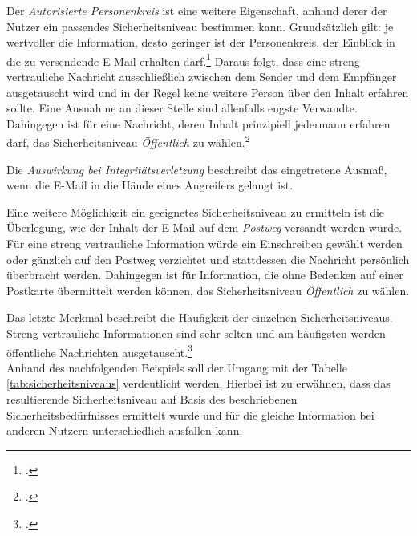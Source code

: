 \documentclass  [paper=a4,
				fontsize=12pt,
				listof=totoc,
				bibliography=totoc
				]{scrreprt}
\begin{document}
		
		Der \textit{Autorisierte Personenkreis} ist eine weitere Eigenschaft, anhand derer der Nutzer ein passendes Sicherheitsniveau bestimmen kann. Grundsätzlich gilt: je wertvoller die Information, desto geringer ist der Personenkreis, der Einblick in die zu versendende E-Mail erhalten darf.\footcite[Vgl.][]{TSE} Daraus folgt, dass eine streng vertrauliche Nachricht ausschließlich zwischen dem Sender und dem Empfänger ausgetauscht wird und in der Regel keine weitere Person über den Inhalt erfahren sollte. Eine Ausnahme an dieser Stelle sind allenfalls engste Verwandte. Dahingegen ist für eine Nachricht, deren Inhalt prinzipiell jedermann erfahren darf, das Sicherheitsniveau \textit{Öffentlich} zu wählen.\footcite[Vgl.][S. 10]{Reinhausen12}
		
		
		Die \textit{Auswirkung bei Integritätsverletzung} beschreibt das eingetretene Ausmaß, wenn die E-Mail in die Hände eines Angreifers gelangt ist.
		
		
		Eine weitere Möglichkeit ein geeignetes Sicherheitsniveau zu ermitteln ist die Überlegung, wie der Inhalt der E-Mail auf dem \textit{Postweg} versandt werden würde. Für eine streng vertrauliche Information würde ein Einschreiben gewählt werden oder gänzlich auf den Postweg verzichtet und stattdessen die Nachricht persönlich überbracht werden. Dahingegen ist für Information, die ohne Bedenken  auf einer Postkarte übermittelt werden können, das Sicherheitsniveau \textit{Öffentlich} zu wählen. 
		
		
		Das letzte Merkmal beschreibt die Häufigkeit der einzelnen Sicherheitsniveaus. Streng vertrauliche Informationen sind sehr selten und am häufigsten werden öffentliche Nachrichten ausgetauscht.\footcite[Vgl.][]{TSE}
		\bigskip\\
		Anhand des nachfolgenden Beispiels soll der Umgang mit der Tabelle \ref{tab:sicherheitsniveaus} verdeutlicht werden. 
		Hierbei ist zu erwähnen, dass das resultierende Sicherheitsniveau auf Basis des beschriebenen Sicherheitsbedürfnisses ermittelt wurde und für die gleiche Information bei anderen Nutzern unterschiedlich ausfallen kann:\medskip
\end{document}
